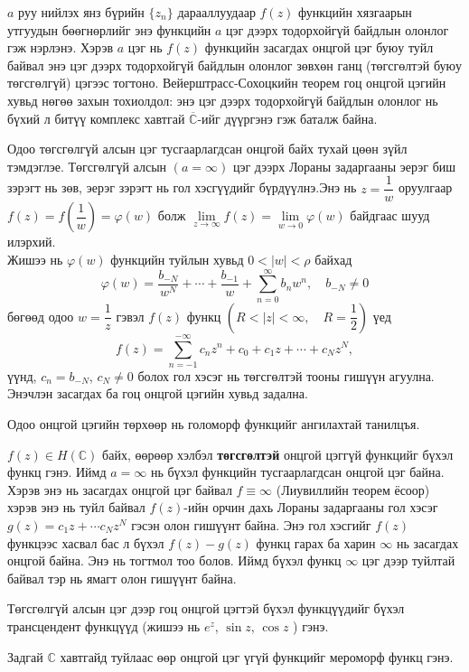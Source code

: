 $a$ руу нийлэх янз бүрийн $\{z_n\}$ дарааллуудаар $f(z)$ функцийн хязгаарын утгуудын бөөгнөрлийг энэ функцийн $a$ цэг дээрх тодорхойгүй байдлын олонлог гэж нэрлэнэ. Хэрэв $a$ цэг нь $f(z)$ функцийн засагдах онцгой цэг буюу туйл байвал энэ цэг дээрх тодорхойгүй байдлын олонлог зөвхөн ганц (төгсгөлтэй буюу төгсгөлгүй) цэгээс тогтоно. Вейерштрасс-Сохоцкийн теорем гоц онцгой цэгийн хувьд нөгөө захын тохиолдол: энэ цэг дээрх тодорхойгүй байдлын олонлог нь бүхий л битүү комплекс хавтгай $\overline{\mathbb{C}}$-ийг дүүргэнэ гэж баталж байна.
 
 Одоо төгсгөлгүй алсын цэг тусгаарлагдсан онцгой байх тухай цөөн зүйл тэмдэглэе. Төгсгөлгүй алсын $(a=\infty)$ цэг дээрх Лораны задаргааны эерэг биш зэрэгт нь зөв, эерэг зэрэгт нь гол хэсгүүдийг бүрдүүлнэ.Энэ нь $z=\dfrac{1}{w}$ оруулгаар $f(z)=f\left(\dfrac{1}{w}\right)=\varphi(w)$ болж $\lim\limits_{z\rightarrow \infty}f(z)=\lim\limits_{w\rightarrow 0}\varphi (w)$ байдгаас шууд илэрхий.\\
 Жишээ нь $\varphi(w)$ функцийн туйлын хувьд $0<|w|<\rho$ байхад 
 $$\varphi (w)=\frac{b_{-N}}{w^N}+\cdots +\frac{b_{-1}}{w}+\sum\limits_{n=0}^\infty b_nw^n, \quad b_{-N}\neq 0$$
 бөгөөд одоо $w=\dfrac{1}{z}$ гэвэл $f(z)$ функц $\left(R<|z|<\infty, \quad R=\dfrac{1}{2}\right)$ үед
 $$f(z)=\sum\limits_{n=-1}^{-\infty} c_nz^n+c_0+c_1z+\cdots +c_Nz^N,$$
 үүнд, $c_n=b_{-N}$, $c_N\neq 0$ болох гол хэсэг нь төгсгөлтэй тооны гишүүн агуулна. Энэчлэн засагдах ба гоц онцгой цэгийн хувьд задална.
 
 Одоо онцгой цэгийн төрхөөр нь голоморф функцийг ангилахтай танилцъя.
 \begin{dfn}
 $f(z)\in H(\mathbb{C})$ байх, өөрөөр хэлбэл \textbf{төгсгөлтэй} онцгой цэггүй функцийг бүхэл функц  гэнэ. Иймд $a=\infty$ нь бүхэл функцийн тусгаарлагдсан онцгой цэг байна. Хэрэв энэ нь засагдах онцгой цэг байвал $f\equiv \infty$ (Лиувиллийн теорем ёсоор) хэрэв энэ нь туйл байвал $f(z)$-ийн орчин дахь Лораны задаргааны гол хэсэг $g(z)=c_1 z+\cdots c_N z^N$ гэсэн олон
гишүүнт байна. Энэ гол хэсгийг $f(z)$ функцээс хасвал бас л бүхэл $f(z)-g(z)$ функц гарах ба харин $\infty$ нь засагдах онцгой байна. Энэ нь тогтмол тоо болов. Иймд бүхэл функц $\infty$ цэг дээр туйлтай байвал тэр нь ямагт олон гишүүнт байна.

Төгсгөлгүй алсын цэг дээр гоц онцгой цэгтэй бүхэл функцүүдийг бүхэл трансцендент функцүүд (жишээ нь $e^z$, $\sin z$, $\cos z$ ) гэнэ. 
 \end{dfn}
 \begin{dfn}
 Задгай $\mathbb{C}$ хавтгайд туйлаас өөр онцгой цэг үгүй функцийг мероморф функц гэнэ.
 \end{dfn}
